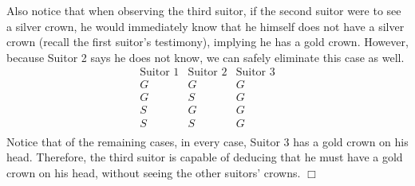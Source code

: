 \documentclass[11pt]{article}
\begin{document}
    Also notice that when observing the third suitor, if the second suitor were to see a silver crown, he would immediately know that he himself does not have a silver crown (recall the first suitor's testimony), implying he has a gold crown. However, because Suitor 2 says he does not know, we can safely eliminate this case as well.
    \begin{displaymath}
    \begin{array}{c|c|c}
    \text{Suitor 1} & \text{Suitor 2} & \text{Suitor 3} \\
    \hline
    G & G & G \\
    G & S & G \\
    S & G & G \\
    S & S & G \\
    \end{array}
    \end{displaymath}
    Notice that of the remaining cases, in every case, Suitor 3 has a gold crown on his head. Therefore, the third suitor is capable of deducing that he must have a gold crown on his head, without seeing the other suitors' crowns. \hfill $\Box$
\newpage
\end{document}
